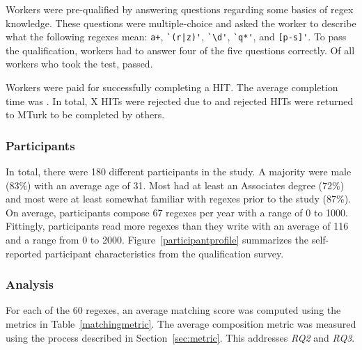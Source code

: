 Workers were pre-qualified by answering questions regarding some basics of regex knowledge. These questions were multiple-choice and asked the worker to describe what the following regexes mean: \verb!a+!, \verb!`(r|z)'!, \verb!`\d'!, \verb!`q*'!, and \verb![p-s]'!. To pass the qualification, workers had to answer four of the five questions correctly. Of all workers who took the test,  passed. 

Workers were paid  for successfully completing a HIT. 
The average completion time was . 
In total, X HITs were rejected due to  and rejected HITs were returned to MTurk to be completed by others. 







\subsubsection{Participants}

In total, there were 180 different participants in the study. 
A majority were male (83\%) with an average age of 31. Most had
at least an Associates degree (72\%) and most were at least somewhat familiar with regexes prior to the study (87\%). On average, 
participants compose 67 regexes per year with a range of 0 to 1000. Fittingly, participants read more regexes than they write with an average of 116 and a range from 0 to 2000. Figure~\ref{participantprofile} summarizes the self-reported participant characteristics from the qualification survey. 

\subsubsection{Analysis}
For each of the 60 regexes, an average matching score was computed using the metrics in Table~\ref{matchingmetric}. The average composition metric was measured using the process described in Section~\ref{sec:metric}. This addresses \emph{RQ2} and \emph{RQ3}. 


